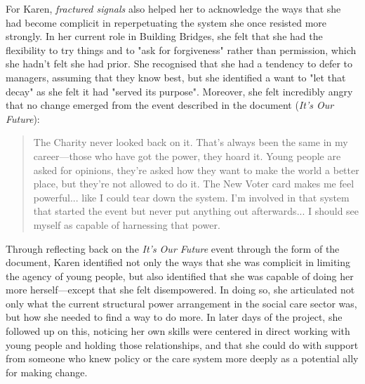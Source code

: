 For Karen, \textit{fractured signals} also helped her to acknowledge the ways that she had become complicit in reperpetuating the system she once resisted more strongly. In her current role in Building Bridges, she felt that she had the flexibility to try things and to "ask for forgiveness" rather than permission, which she hadn't felt she had prior. She recognised that she had a tendency to defer to managers,  assuming that they know best, but she identified a want to "let that decay" as she felt it had "served its purpose". Moreover, she felt incredibly angry that no change emerged from the event described in the document (\textit{It's Our Future}):
\begin{quote}
The Charity never looked back on it. That's always been the same in my career—those who have got the power, they hoard it. Young people are asked for opinions, they're asked how they want to make the world a better place, but they're not allowed to do it. The New Voter card makes me feel powerful... like I could tear down the system. I'm involved in that system that started the event but never put anything out afterwards... I should see myself as capable of harnessing that power.
\end{quote}
Through reflecting back on the \textit{It's Our Future} event through the form of the document, Karen identified not only the ways that she was complicit in limiting the agency of young people, but also identified that she was capable of doing her more herself—except that she felt disempowered. In doing so, she articulated not only what the current structural power arrangement in the social care sector was, but how she needed to find a way to do more. In later days of the project, she followed up on this, noticing her own skills were centered in direct working with young people and holding those relationships, and that she could do with support from someone who knew policy or the care system more deeply as a potential ally for making change. 

